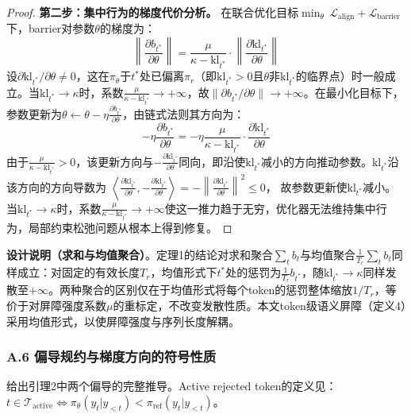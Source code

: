 \documentclass[lettersize,journal]{IEEEtran}
\begin{document}
\begin{proof}
\textbf{第二步：集中行为的梯度代价分析。}
在联合优化目标$\min_\theta\,\mathcal{L}_{\text{align}} + \mathcal{L}_{\text{barrier}}$下，barrier对参数$\theta$的梯度为：
\begin{equation}
    \left\|\frac{\partial b_{t^*}}{\partial \theta}\right\| = 
    \frac{\mu}{\kappa - \mathrm{kl}_{t^*}} \cdot 
    \left\|\frac{\partial \mathrm{kl}_{t^*}}{\partial \theta}\right\|
\end{equation}
设$\partial \mathrm{kl}_{t^*}/\partial \theta \neq 0$，这在$\pi_\theta$于$t^*$处已偏离$\pi_r$（即$\mathrm{kl}_{t^*} > 0$且$\theta$非$\mathrm{kl}_{t^*}$的临界点）时一般成立。当$\mathrm{kl}_{t^*} \to \kappa$时，系数$\frac{\mu}{\kappa - \mathrm{kl}_{t^*}} \to +\infty$，故$\|\partial b_{t^*}/\partial\theta\| \to +\infty$。在最小化目标下，参数更新为$\theta \leftarrow \theta - \eta\frac{\partial b_{t^*}}{\partial\theta}$，由链式法则其方向为：
\begin{equation}
-\eta\frac{\partial b_{t^*}}{\partial\theta} = 
-\eta\frac{\mu}{\kappa - \mathrm{kl}_{t^*}}\cdot
\frac{\partial\mathrm{kl}_{t^*}}{\partial\theta}
\end{equation}
由于$\frac{\mu}{\kappa-\mathrm{kl}_{t^*}} > 0$，该更新方向与$-\frac{\partial\mathrm{kl}_{t^*}}{\partial\theta}$同向，即沿使$\mathrm{kl}_{t^*}$减小的方向推动参数。$\mathrm{kl}_{t^*}$沿该方向的方向导数为
$\left\langle\frac{\partial\mathrm{kl}_{t^*}}{\partial\theta},
-\frac{\partial\mathrm{kl}_{t^*}}{\partial\theta}\right\rangle
= -\left\|\frac{\partial\mathrm{kl}_{t^*}}{\partial\theta} \right\|^2 \leq 0$，
故参数更新使$\mathrm{kl}_{t^*}$减小。当$\mathrm{kl}_{t^*} \to \kappa$时，系数$\frac{\mu}{\kappa - \mathrm{kl}_{t^*}} \to +\infty$使这一推力趋于无穷，优化器无法维持集中行为，局部约束松弛问题从根本上得到修复。
\end{proof}

\textbf{设计说明（求和与均值聚合）}。定理1的结论对求和聚合$\sum_t b_t$与均值聚合$\frac{1}{T_r}\sum_t b_t$同样成立：对固定的有效长度$T_r$，均值形式下$t^*$处的惩罚为$\frac{1}{T_r}b_{t^*}$，随$\mathrm{kl}_{t^*} \to \kappa$同样发散至$+\infty$。两种聚合的区别仅在于均值形式将每个token的惩罚整体缩放$1/T_r$，等价于对屏障强度系数$\mu$的重标定，不改变发散性质。本文token级语义屏障（定义4）采用均值形式，以使屏障强度与序列长度解耦。

\subsubsection*{A.6 偏导规约与梯度方向的符号性质}\label{app:active-partial}
给出引理2中两个偏导的完整推导。Active rejected token的定义见\label{eq:active-def}：$t \in \mathcal{T}_{\text{active}} \iff \pi_\theta(y_t|y_{<t}) < \pi_{\text{ref}}(y_t|y_{<t})$。
\end{document}
